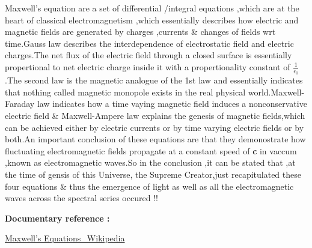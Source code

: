 \documentclass[a4paper,12pt]{article}
\begin{document}
Maxwell's equation are a set of differential /integral equations ,which are at the heart of classical electromagnetism ,which essentially describes how electric and magnetic fields are generated by charges ,currents \& changes of fields wrt time.Gauss law describes the interdependence of electrostatic field and electric charges.The net flux of the electric field through a closed surface is essentially propertional to net electric charge inside it with a propertionality constant of $ \frac{1}{\epsilon_{0}} $.The second law is the magnetic analogue of the 1st law and essentially indicates that nothing called magnetic monopole exists in the real physical world.Maxwell-Faraday law indicates how a time vaying magnetic field induces a nonconservative electric field \& Maxwell-Ampere law explains the genesis of magnetic fields,which can be achieved either by electric currents or by time varying electric fields or by both.An important conclusion of these equations are that they demonostrate how fluctuating electromagnetic fields propagate at a constant speed of {\bf{c}} in vaccum ,known as electromagnetic waves.So in the conclusion ,it can be stated that ,at the time of gensis of this Universe, the Supreme Creator,just recapitulated these four equations \& thus the emergence of light as well as all the electromagnetic waves across the spectral series occured !!


\bf{Documentary reference :}


\href{https://en.wikipedia.org/wiki/Maxwell\%27s\_equations}{Maxwell's Equations\_Wikipedia}
\end{document}
